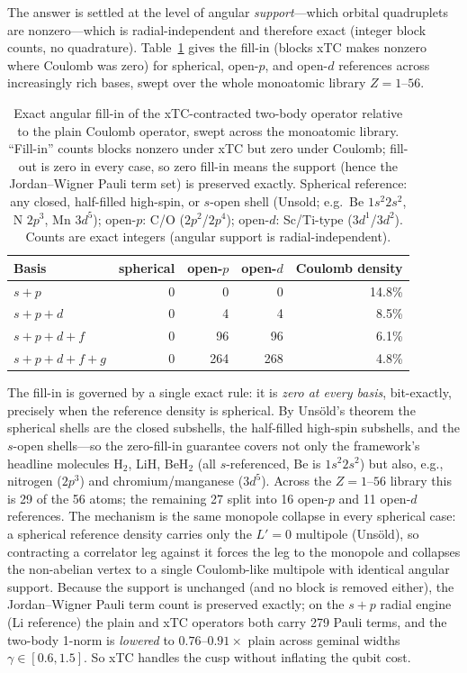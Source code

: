 \documentclass[aps,pra,twocolumn,superscriptaddress,longbibliography]{revtex4-2}
\newcommand{\gvq}[2]{#2}
\begin{document}
The answer is settled at the level of angular \emph{support}---which orbital
quadruplets are nonzero---which is radial-independent and therefore exact (integer
block counts, no quadrature).  Table~\ref{tab:xtc_fillin} gives the fill-in (blocks
xTC makes nonzero where Coulomb was zero) for spherical, open-$p$, and open-$d$
references across increasingly rich bases, swept over the whole monoatomic library
$Z=1$--$56$.

\begin{table}[t]
\caption{Exact angular fill-in of the xTC-contracted two-body operator relative to
the plain Coulomb operator, swept across the monoatomic library.  ``Fill-in'' counts
blocks nonzero under xTC but zero under Coulomb; fill-out is zero in every case, so
zero fill-in means the support (hence the Jordan--Wigner Pauli term set) is preserved
exactly.  Spherical reference: any closed, half-filled high-spin, or $s$-open shell
(Unsold; e.g.\ Be $1s^2 2s^2$, N $2p^3$, Mn $3d^5$); open-$p$: C/O ($2p^2$/$2p^4$);
open-$d$: Sc/Ti-type ($3d^1$/$3d^2$).  Counts are exact integers (angular support is
radial-independent).}
\label{tab:xtc_fillin}
\begin{ruledtabular}
\begin{tabular}{lrrrr}
Basis & {spherical} & {open-$p$} & {open-$d$} & {Coulomb density} \\
\hline
$s+p$       & 0 & 0   & 0   & 14.8\% \\
$s+p+d$     & 0 & 4   & 4   & 8.5\%  \\
$s+p+d+f$   & 0 & 96  & 96  & 6.1\%  \\
$s+p+d+f+g$ & 0 & 264 & 268 & 4.8\%  \\
\end{tabular}
\end{ruledtabular}
\end{table}

The fill-in is governed by a single exact rule: it is \emph{zero at every basis},
bit-exactly, precisely when the reference density is spherical.  By Uns\"old's theorem
the spherical shells are the closed subshells, the half-filled high-spin subshells,
and the $s$-open shells---so the zero-fill-in guarantee covers not only the framework's
headline molecules H$_2$, LiH, BeH$_2$ (all $s$-referenced, Be is $1s^2 2s^2$) but
also, e.g., nitrogen ($2p^3$) and chromium/manganese ($3d^5$).  Across the
$Z=1$--$56$ library this is 29 of the 56 atoms; the remaining 27 split into 16
open-$p$ and 11 open-$d$ references.  The mechanism is the same monopole collapse in
every spherical case: a spherical reference density carries only the $L'=0$ multipole
(Uns\"old), so contracting a correlator leg against it forces the leg to the monopole
and collapses the non-abelian vertex to a single Coulomb-like multipole with identical
angular support.  Because the support is unchanged (and no block is removed either),
the Jordan--Wigner Pauli term count is preserved exactly; on the $s+p$ radial engine
(Li reference) the plain and xTC operators both carry \gvq{block_sp_n2_pauli}{279} Pauli terms, and the
two-body 1-norm is \emph{lowered} to $0.76$--$0.91\times$ plain across geminal widths
$\gamma \in [0.6, 1.5]$.  So xTC handles the cusp without inflating the qubit cost.
\end{document}
